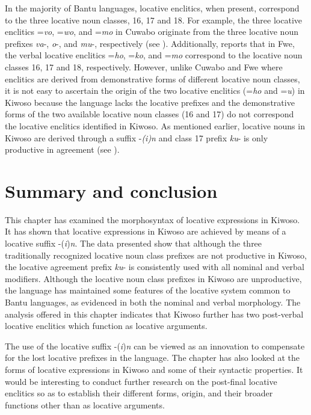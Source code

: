 \documentclass[output=paper]{langscibook}
\begin{document}
In the majority of Bantu languages, locative enclitics, when present, correspond to the three locative noun classes, 16, 17 and 18. For example, the three locative enclitics =\textit{vo}, =\textit{wo}, and =\textit{mo} in Cuwabo originate from the three locative noun prefixes \textit{va}{}-, \textit{o}{}-, and \textit{mu}{}-, respectively (see \citealt[5]{Guérois2017}). Additionally, \citet[3]{Gunnink2017} reports that in Fwe, the verbal locative enclitics =\textit{ho}, =\textit{ko}, and =\textit{mo} correspond to the locative noun classes 16, 17 and 18, respectively. However, unlike Cuwabo and Fwe where enclitics are derived from demonstrative forms of different locative noun classes, it is not easy to ascertain the origin of the two locative enclitics (=\textit{ho} and =\textit{u}) in Kiwoso because the language lacks the locative prefixes and the demonstrative forms of the two available locative noun classes (16 and 17) do not correspond the locative enclitics identified in Kiwoso. As mentioned earlier, locative nouns in Kiwoso are derived through a suffix -\textit{(i)n} and class 17 prefix \textit{ku}{}- is only productive in agreement (see ).

\section{Summary and conclusion}
\label{sec:mallya:5}

This chapter has examined the morphosyntax of locative expressions in Kiwoso. It has shown that locative expressions in Kiwoso are achieved by means of a locative suffix -(\textit{i})\textit{n}. The data presented show that although the three traditionally recognized locative noun class prefixes are not productive in Kiwoso, the locative agreement prefix \textit{ku}{}- is consistently used with all nominal and verbal modifiers. Although the locative noun class prefixes in Kiwoso are unproductive, the language has maintained some features of the locative system common to Bantu languages, as evidenced in both the nominal and verbal morphology. The analysis offered in this chapter indicates that Kiwoso further has two post-verbal locative enclitics which function as locative arguments.

The use of the locative suffix -(\textit{i})\textit{n} can be viewed as an innovation to compensate for the lost locative prefixes in the language. The chapter has also looked at the forms of locative expressions in Kiwoso and some of their syntactic properties. It would be interesting to conduct further research on the post-final locative enclitics so as to establish their different forms, origin, and their broader functions other than as locative arguments.
\end{document}
